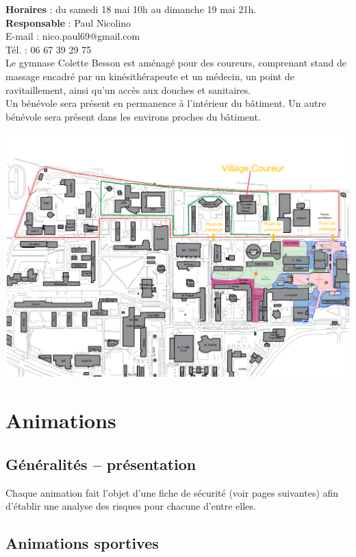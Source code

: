 \documentclass[hidelinks, paper=a4, fontsize=13pt]{report}
\begin{document}
\textbf{Horaires} : du samedi 18 mai 10h au dimanche 19 mai 21h.\\

\textbf{Responsable} : Paul Nicolino\\
	E-mail : nico.paul69@gmail.com\\
	Tél. : 06 67 39 29 75\\

Le gymnase Colette Besson est aménagé pour des coureurs, comprenant stand de massage encadré par un kinésithérapeute et un médecin, un point de ravitaillement, ainsi qu’un accès aux douches et sanitaires.\\

Un bénévole sera présent en permanence à l’intérieur du bâtiment. Un autre bénévole sera présent dans les environs proches du bâtiment. \\

\begin{center}
\includegraphics[width=.8\textwidth,keepaspectratio]{Exports/Plan_24h_45eme-Parcours_courses}
\end{center}
\newpage
\section{Animations}
\subsection{Généralités – présentation}


Chaque animation fait l’objet d’une fiche de sécurité (voir pages suivantes) afin d’établir une analyse des risques pour chacune d’entre elles.

\subsection{Animations sportives}
\end{document}
